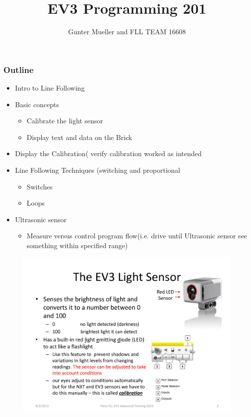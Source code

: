 \documentclass[11pt]{beamer}
\author{Gunter Mueller and FLL TEAM 16608}
\title{EV3 Programming 201}
\begin{document}
\begin{frame}
\titlepage
\end{frame}



\begin{frame}
\frametitle{Outline}
\begin{itemize}
\item Intro to Line Following
\item  Basic concepts
\begin{itemize}
\item Calibrate the light sensor
\item Display text and data on the Brick
\end{itemize}
\item Display the Calibration( verify calibration worked as intended
\item Line Following Techniques (switching and proportional
\begin{itemize}
\item Switches
\item Loops
\end{itemize}
\item Ultrasonic sensor
\begin{itemize}
\item  Measure versus control program flow(i.e. drive until Ultrasonic sensor see something within specified range)
\end{itemize}

\end{itemize}
\end{frame}



\begin{frame}
\begin{figure}
\includegraphics[scale=0.4]{ev3advanced2015/file-page3}
\end{figure}
\end{frame}
\end{document}
